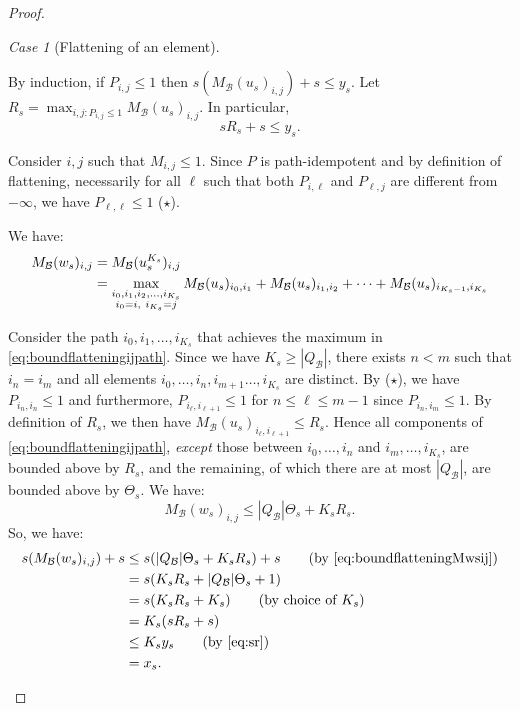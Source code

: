 \documentclass{lmcs}
\theoremstyle{remark}
\newtheorem{case}{Case}
\newcommand{\autB}{\mathcal{B}}
\theoremstyle{remark}
\begin{document}
\begin{proof}
\begin{case}[Flattening of an element]
\begin{itemize}
By induction, if $P_{i,j} \le 1$ then $s( M_\autB(u_s)_{i,j}) + s \le y_s$. Let $R_s = \displaystyle\max_{i,j : P_{i,j}\le 1} M_\autB(u_s)_{i,j}$. In particular, 
\begin{equation}\label{eq:sr}sR_s + s \le y_s.\end{equation}

Consider $i,j$ such that $M_{i,j}\leq 1$. Since $P$ is path-idempotent and by definition of flattening, necessarily for all $\ell$ such that both $P_{i,\ell}$ and $P_{\ell,j}$ are different from $-\infty$, we have $P_{\ell,\ell} \le 1$ ($\star$).

We have:
\begin{align}M_\autB(w_s)_{i,j} &= M_\autB(u_s^{K_s})_{i,j}  \notag
\\ &= \max_{\substack{i_0,i_{1},i_2,\dots,i_{K_s}\\i_{0}=i,\ i_{K_s}=j }}  M_\autB(u_s)_{i_0,i_1} + M_\autB(u_s)_{i_1,i_2} + \dots + M_\autB(u_s)_{i_{K_s-1},i_{K_s}} \label{eq:boundflatteningijpath}
\end{align}

Consider the path $i_0,i_1,\dots,i_{K_s}$ that achieves the maximum in \cref{eq:boundflatteningijpath}. Since we have $K_s\ge|Q_\autB|$, there exists $n<m$ such that $i_n= i_m$ and all elements $i_0,\dots,i_{n},i_{m+1}\dots,i_{K_s}$ are distinct. By ($\star$), we have $P_{i_n,i_n} \le 1$ and furthermore, $P_{i_\ell,i_{\ell+1}} \le 1$ for $n\le \ell \le m-1$ since $P_{i_n,i_m}\le 1$. By definition of $R_s$, we then have $M_\autB(u_s)_{i_{\ell},i_{\ell+1}} \le R_s$. Hence all components of \cref{eq:boundflatteningijpath}, \emph{except} those between $i_0,\dots,i_n$ and $i_m,\dots,i_{K_s}$, are bounded above by $R_s$, and the remaining, of which there are at most $|Q_\autB|$, are bounded above by $\Theta_s$.
We have: 
\begin{equation}\label{eq:boundflatteningMwsij}M_\autB(w_s)_{i,j} \le |Q_\autB|\Theta_s + K_s R_s.\end{equation}
So, we have:
\begin{align*}
s(M_\autB(w_s)_{i,j}) + s &\le s( |Q_\autB|\Theta_s + K_s R_s) + s \tag{by \cref{eq:boundflatteningMwsij}}
\\&= s(K_s R_s +  |Q_\autB|\Theta_s   +1)
\\&= s(K_s R_s +  K_s)
\tag{by choice of $K_s$}
\\&= K_s (sR_s +  s)
\\&\le K_s y_s  \tag{by \cref{eq:sr}}
\\& = x_s. \tag*{\qed}
\end{align*}
\end{itemize}
\end{case}
\renewcommand{\qed}{}
\end{proof}
\end{document}
